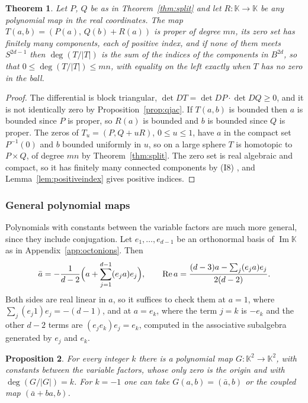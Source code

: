 \documentclass[11pt]{amsart}
\numberwithin{equation}{section}
\theoremstyle{plain}
\newtheorem{theorem}{Theorem}[section]
\newtheorem{proposition}[theorem]{Proposition}
\theoremstyle{definition}
\theoremstyle{remark}
\newcommand{\K}{\mathbb{K}}
\newcommand{\Imag}{\operatorname{Im}}
\renewcommand{\Re}{\operatorname{Re}}
\begin{document}
\begin{theorem}\label{thm:triangular}
Let $P$, $Q$ be as in Theorem~\ref{thm:split} and let $R\colon\K\to\K$ be any polynomial map in the real coordinates. The map $T(a,b)=(P(a),\,Q(b)+R(a))$ is proper of degree $mn$, its zero set has finitely many components, each of positive index, and if none of them meets $S^{2d-1}$ then $\deg(T/|T|)$ is the sum of the indices of the components in $B^{2d}$, so that $0\le\deg(T/|T|)\le mn$, with equality on the left exactly when $T$ has no zero in the ball.
\end{theorem}

\begin{proof}
The differential is block triangular, $\det DT=\det DP\cdot\det DQ\ge0$, and it is not identically zero by Proposition~\ref{prop:qjac}. If $T(a,b)$ is bounded then $a$ is bounded since $P$ is proper, so $R(a)$ is bounded and $b$ is bounded since $Q$ is proper. The zeros of $T_u=(P,Q+uR)$, $0\le u\le1$, have $a$ in the compact set $P^{-1}(0)$ and $b$ bounded uniformly in $u$, so on a large sphere $T$ is homotopic to $P\times Q$, of degree $mn$ by Theorem~\ref{thm:split}. The zero set is real algebraic and compact, so it has finitely many connected components by (I8) \cite[Theorem~2.4.4]{BCR98}, and Lemma~\ref{lem:positiveindex} gives positive indices.
\end{proof}

\subsubsection{General polynomial maps}

Polynomials with constants between the variable factors are much more general, since they include conjugation. Let $e_1,\dots,e_{d-1}$ be an orthonormal basis of $\Imag\K$ as in Appendix~\ref{app:octonions}. Then
\begin{equation}\label{eq:conjword}
\bar a=-\frac1{d-2}\Bigl(a+\sum_{j=1}^{d-1}(e_ja)e_j\Bigr),\qquad \Re a=\frac{(d-3)a-\sum_{j}(e_ja)e_j}{2(d-2)} .
\end{equation}
Both sides are real linear in $a$, so it suffices to check them at $a=1$, where $\sum_j(e_j1)e_j=-(d-1)$, and at $a=e_k$, where the term $j=k$ is $-e_k$ and the other $d-2$ terms are $(e_je_k)e_j=e_k$, computed in the associative subalgebra generated by $e_j$ and $e_k$.

\begin{proposition}\label{prop:negative}
For every integer $k$ there is a polynomial map $G\colon\K^2\to\K^2$, with constants between the variable factors, whose only zero is the origin and with $\deg(G/|G|)=k$. For $k=-1$ one can take $G(a,b)=(\bar a,b)$ or the coupled map $(\bar a+ba,b)$.
\end{proposition}
\end{document}
